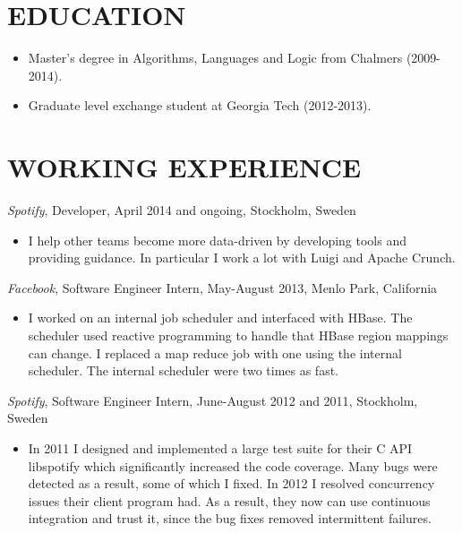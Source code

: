\documentclass[11pt]{res} %
\begin{document}
\begin{resume}
\section{EDUCATION}
 \begin{itemize} %
   \item Master's degree in Algorithms, Languages and Logic from Chalmers
     (2009-2014).
   \item Graduate level exchange student at Georgia Tech (2012-2013).
 \end{itemize}

\section{WORKING EXPERIENCE}
\emph{Spotify}, {\footnotesize Developer, April 2014 and ongoing}, Stockholm, Sweden
\vspace{0.2in}
   \begin{itemize}
     \item I help other teams become more data-driven by developing tools and
     providing guidance.  In particular I work a lot with Luigi and Apache
     Crunch.
 \end{itemize}

\emph{Facebook}, {\footnotesize Software Engineer Intern, May-August 2013}, Menlo Park, California
\vspace{0.2in}
   \begin{itemize}
   \item I worked on an internal job scheduler and interfaced with HBase. The
     scheduler used reactive programming to handle that HBase region mappings
     can change. I replaced a map reduce job with one using the internal
     scheduler. The internal scheduler were two times as fast.
 \end{itemize}

 \emph{Spotify}, {\footnotesize Software Engineer Intern, June-August 2012 and 2011}, Stockholm, Sweden
\vspace{0.2in}
   \begin{itemize} %
   \item In 2011 I designed and implemented a large test suite for their C API
     libspotify which significantly increased the code coverage. Many bugs were
     detected as a result, some of which I fixed. In 2012 I resolved
     concurrency issues their client program had. As a result, they now can use
     continuous integration and trust it, since the bug fixes removed
     intermittent failures.


\end{itemize}
\end{resume}
\end{document}
